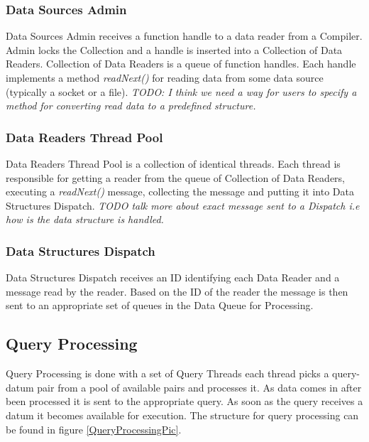 \documentclass[11pt]{article}
\begin{document}
\subsubsection{Data Sources Admin}

Data Sources Admin receives a function handle to a data reader from a Compiler. Admin locks the Collection and a handle is inserted into a Collection of Data Readers. Collection of Data Readers is a queue of function handles. Each handle implements a method \emph{readNext()} for reading data from some data source (typically a socket or a file).  \emph{TODO: I think we need a way for users to specify a method for converting read data to a predefined structure.}

\subsubsection{Data Readers Thread Pool}

Data Readers Thread Pool is a collection of identical threads. Each thread is responsible for getting a reader from the queue of Collection of Data Readers, executing a \emph{readNext()} message, collecting the message and putting it into Data Structures Dispatch. \emph{TODO talk more about exact message sent to a Dispatch i.e how is the data structure is handled.}

\subsubsection{Data Structures Dispatch}

Data Structures Dispatch receives an ID identifying each Data Reader and a message read by the reader. Based on the ID of the reader the message is then sent to an appropriate set of queues in the Data Queue for Processing. 



\subsection{Query Processing}

Query Processing is done with a set of Query Threads each thread picks a query-datum pair from a pool of available pairs and processes it. As data comes in after been processed it is sent to the appropriate query. As soon as the query receives a datum it becomes available for execution. The structure for query processing can be found in figure \ref{QueryProcessingPic}.
\end{document}

